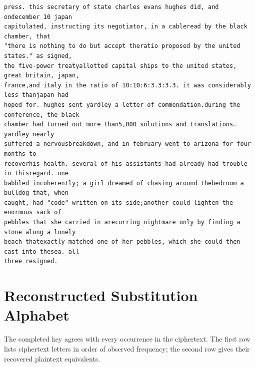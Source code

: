 \documentclass[11pt,a4paper]{article}
\begin{document}
\begin{lstlisting}[style=ciphertext,caption={Complete text after iteration 12}]
press. this secretary of state charles evans hughes did, and ondecember 10 japan
capitulated, instructing its negotiator, in a cableread by the black chamber, that
"there is nothing to do but accept theratio proposed by the united states." as signed,
the five-power treatyallotted capital ships to the united states, great britain, japan,
france,and italy in the ratio of 10:10:6:3.3:3.3. it was considerably less thanjapan had
hoped for. hughes sent yardley a letter of commendation.during the conference, the black
chamber had turned out more than5,000 solutions and translations. yardley nearly
suffered a nervousbreakdown, and in february went to arizona for four months to
recoverhis health. several of his assistants had already had trouble in thisregard. one
babbled incoherently; a girl dreamed of chasing around thebedroom a bulldog that, when
caught, had "code" written on its side;another could lighten the enormous sack of
pebbles that she carried in arecurring nightmare only by finding a stone along a lonely
beach thatexactly matched one of her pebbles, which she could then cast into thesea. all
three resigned.
\end{lstlisting}


\newpage
\section{Reconstructed Substitution Alphabet}

The completed key agrees with every occurrence in the ciphertext. The first row lists ciphertext letters in order of observed frequency; the second row gives their recovered plaintext equivalents.

\begin{table}[H]
\centering
\setlength{\tabcolsep}{3.5pt}
\renewcommand{\arraystretch}{1.25}
\caption{Recovered substitution key for Variant 20, ordered by observed frequency.}
\end{table}
\end{document}
